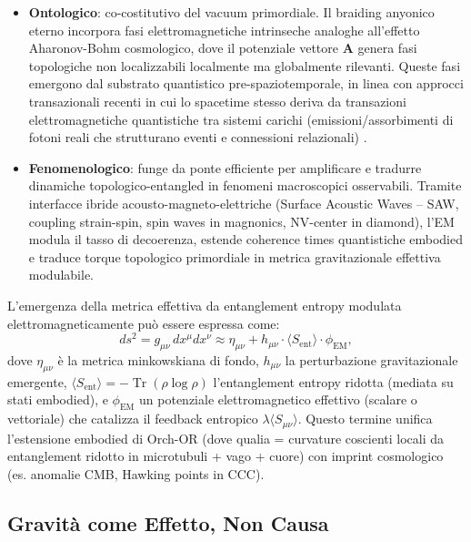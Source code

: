 \documentclass[12pt,a4paper]{article}
\begin{document}
\begin{itemize}
    \item \textbf{Ontologico}: co-costitutivo del vacuum primordiale. Il braiding anyonico eterno incorpora fasi elettromagnetiche intrinseche analoghe all'effetto Aharonov-Bohm cosmologico, dove il potenziale vettore $\mathbf{A}$ genera fasi topologiche non localizzabili localmente ma globalmente rilevanti. Queste fasi emergono dal substrato quantistico pre-spaziotemporale, in linea con approcci transazionali recenti in cui lo spacetime stesso deriva da transazioni elettromagnetiche quantistiche tra sistemi carichi (emissioni/assorbimenti di fotoni reali che strutturano eventi e connessioni relazionali) \cite{KastnerSchlatter2025}.
    
    \item \textbf{Fenomenologico}: funge da ponte efficiente per amplificare e tradurre dinamiche topologico-entangled in fenomeni macroscopici osservabili. Tramite interfacce ibride acousto-magneto-elettriche (Surface Acoustic Waves -- SAW, coupling strain-spin, spin waves in magnonics, NV-center in diamond), l'EM modula il tasso di decoerenza, estende coherence times quantistiche embodied e traduce torque topologico primordiale in metrica gravitazionale effettiva modulabile.
\end{itemize}

L'emergenza della metrica effettiva da entanglement entropy modulata elettromagneticamente può essere espressa come:
\begin{equation}
ds^2 = g_{\mu\nu} \, dx^\mu dx^\nu \approx \eta_{\mu\nu} + h_{\mu\nu} \cdot \langle S_{\mathrm{ent}} \rangle \cdot \phi_{\mathrm{EM}},
\label{eq:metric_emergence}
\end{equation}
dove $\eta_{\mu\nu}$ è la metrica minkowskiana di fondo, $h_{\mu\nu}$ la perturbazione gravitazionale emergente, $\langle S_{\mathrm{ent}} \rangle = -\operatorname{Tr}(\rho \log \rho)$ l'entanglement entropy ridotta (mediata su stati embodied), e $\phi_{\mathrm{EM}}$ un potenziale elettromagnetico effettivo (scalare o vettoriale) che catalizza il feedback entropico $\lambda \langle S_{\mu\nu} \rangle$. Questo termine unifica l'estensione embodied di Orch-OR (dove qualia = curvature coscienti locali da entanglement ridotto in microtubuli + vago + cuore) con imprint cosmologico (es. anomalie CMB, Hawking points in CCC).

\subsection{Gravità come Effetto, Non Causa}
\end{document}
